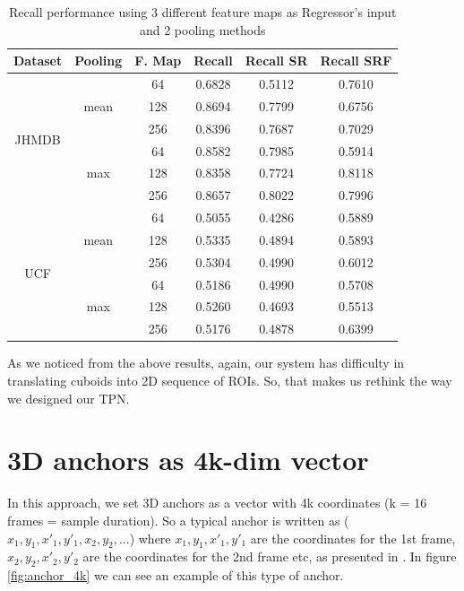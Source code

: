 \begin{table}[h]
  \centering
  \begin{tabular}{||c | c | c || c  c  c ||}
    \hline
    \textbf{Dataset} & \textbf{Pooling} & \textbf{F. Map} & \textbf{Recall} &  \textbf{ Recall SR}  &  \textbf{Recall SRF} \\
    \hline
    \multirow{6}{*}{JHMDB} & \multirow{3}{*}{mean} & 64 &  0.6828  & 0.5112  & 0.7610 \\
    \cline{3-6}
    {} & {} & 128 & 0.8694 & 0.7799 & 0.6756 \\
    \cline{3-6}
    {} & {} & 256 & 0.8396 & 0.7687 & 0.7029 \\
    \cline{2-6}
    {} & \multirow{3}{*}{max} & 64 &  0.8582 & 0.7985 & 0.5914\\
    \cline{3-6}
    {} & {} & 128 & 0.8358 & 0.7724 & 0.8118 \\
    \cline{3-6}
    {} & {} & 256 & 0.8657 & 0.8022 & 0.7996 \\
    \hline
    \multirow{6}{*}{UCF} & \multirow{3}{*}{mean} & 64 & 0.5055 & 0.4286 & 0.5889 \\
    \cline{3-6}
    {} & {} & 128 & 0.5335 & 0.4894 & 0.5893 \\
    \cline{3-6}
    {} & {} & 256 & 0.5304 & 0.4990 & 0.6012 \\
    \cline{2-6}
    {} & \multirow{3}{*}{max} & 64 & 0.5186 & 0.4990 & 0.5708 \\
    \cline{3-6}
    {} & {} & 128 & 0.5260 & 0.4693 & 0.5513 \\
    \cline{3-6}
    {} & {} & 256 & 0.5176 & 0.4878 & 0.6399 \\
    \hline

  \end{tabular}
  \caption{Recall performance using 3 different feature maps as Regressor's input and 2 pooling methods}
  \label{table:reg_1_2}
\end{table}

As we noticed from the above results, again, our system has difficulty in translating cuboids into 2D sequence of ROIs.
So, that makes us rethink the way we designed our TPN.


\section{ 3D anchors as 4k-dim vector}
In this approach, we set 3D anchors as a vector with 4k coordinates (k = 16 frames = sample duration). So a typical anchor is written as ($x_1, y_1, x'_1, y'_1, x_2, y_2, ...$)
where $x_1, y_1, x'_1, y'_1 $ are the coordinates for the 1st frame, $x_2, y_2, x'_2, y'_2$ are the coordinates for the 2nd frame etc, as presented in \cite{DBLP:journals/corr/abs-1712-09184}.
In figure \ref{fig:anchor_4k} we can see an example of this type of anchor.

